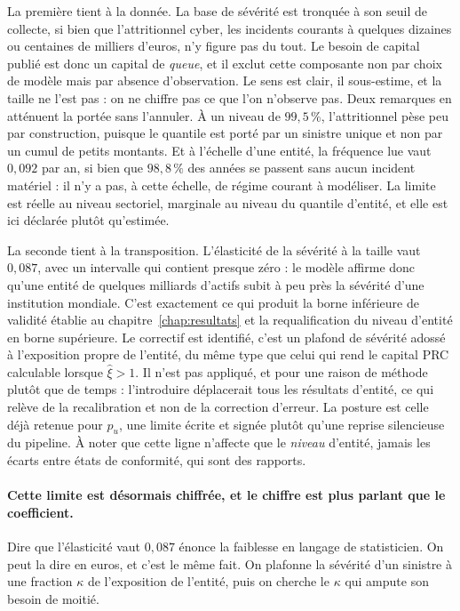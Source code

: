 La première tient à la donnée. La base de sévérité est tronquée à son seuil de collecte, si bien
que l'attritionnel cyber, les incidents courants à quelques dizaines ou centaines de
milliers d'euros, n'y figure pas du tout. Le besoin de capital publié est donc un capital de
\emph{queue}, et il exclut cette composante non par choix de modèle mais par absence
d'observation. Le sens est clair, il sous-estime, et la taille ne l'est pas : on ne chiffre pas
ce que l'on n'observe pas. Deux remarques en atténuent la portée sans l'annuler. À un niveau de
$99{,}5\,\%$, l'attritionnel pèse peu par construction, puisque le quantile est porté par un
sinistre unique et non par un cumul de petits montants. Et à l'échelle d'une entité, la
fréquence lue vaut $0{,}092$ par an, si bien que $98{,}8\,\%$ des années se passent sans aucun
incident matériel : il n'y a pas, à cette échelle, de régime courant à modéliser. La limite est
réelle au niveau sectoriel, marginale au niveau du quantile d'entité, et elle est ici déclarée
plutôt qu'estimée.

La seconde tient à la transposition. L'élasticité de la sévérité à la taille vaut $0{,}087$, avec
un intervalle qui contient presque zéro : le modèle affirme donc qu'une entité de quelques
milliards d'actifs subit à peu près la sévérité d'une institution mondiale. C'est exactement ce
qui produit la borne inférieure de validité établie au
chapitre~\ref{chap:resultats} et la requalification du niveau d'entité en borne supérieure. Le
correctif est identifié, c'est un plafond de sévérité adossé à l'exposition propre de
l'entité, du même type que celui qui rend le capital PRC calculable lorsque
$\hat\xi>1$. Il n'est pas appliqué, et pour une raison de méthode plutôt que de temps :
l'introduire déplacerait tous les résultats d'entité, ce qui relève de la recalibration et non
de la correction d'erreur. La posture est celle déjà retenue pour $p_u$, une limite écrite et
signée plutôt qu'une reprise silencieuse du pipeline. À noter que cette ligne n'affecte que le
\emph{niveau} d'entité, jamais les écarts entre états de conformité, qui sont des rapports.

\paragraph{Cette limite est désormais chiffrée, et le chiffre est plus parlant que le
coefficient.} Dire que l'élasticité vaut $0{,}087$ énonce la faiblesse en langage de
statisticien. On peut la dire en euros, et c'est le même fait. On plafonne la sévérité d'un
sinistre à une fraction $\kappa$ de l'exposition de l'entité, puis on cherche le $\kappa$ qui
ampute son besoin de moitié.

